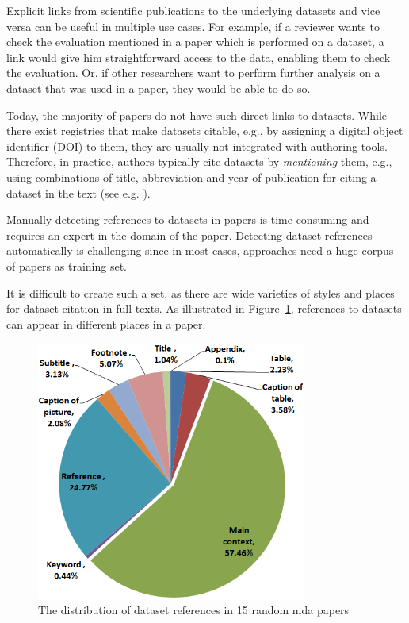 \documentclass{IOS-Book-Article}
\begin{document}
Explicit links from scientific publications to the underlying datasets and vice versa can be useful in multiple use cases.
For example, if a reviewer wants to check the evaluation mentioned in a paper which is performed on a dataset, a link would give him straightforward access to the data, enabling them to check the evaluation.
Or, if other researchers want to perform further analysis on a dataset that was used in a paper, they would be able to do so. 

Today, the majority of papers do not have such direct links to datasets.
While there exist registries that make datasets citable, e.g., by assigning a digital object identifier (DOI) to them, they are usually not integrated with authoring tools.
Therefore, in practice, authors typically cite datasets by \emph{mentioning} them, e.g., using  
combinations of title, abbreviation and year of publication for citing a dataset in the text (see e.g. \citet{Mathiak2015}).  

Manually detecting references to datasets in papers is time consuming and requires an expert in the domain of the paper. 
Detecting dataset references automatically is challenging since in most cases, approaches need a huge corpus of papers as training set. 

It is difficult to create such a set, as there are wide varieties of styles and places for dataset citation in full texts. As illustrated in Figure~\ref{fig:places-example}, references to datasets can appear in different places in a paper.  

\begin{figure}[h]
	\centering
	\includegraphics[width=3.5in]{DistPlaces3.PNG}
	\caption{The distribution of dataset references in 15 random mda papers}
	\label{fig:places-example}
\end{figure}
\end{document}
